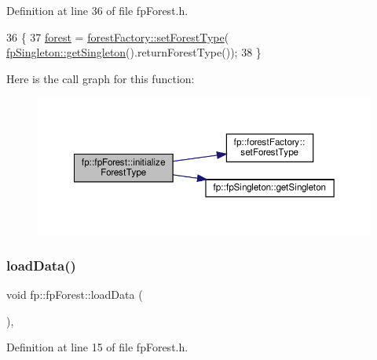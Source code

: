 Definition at line 36 of file fp\+Forest.\+h.


\begin{DoxyCode}
36                                               \{
37                 \hyperlink{classfp_1_1fpForest_a4ce6af867d36c8d62c860db8982235c4}{forest} = \hyperlink{classfp_1_1forestFactory_a856050d77f96dd155d41b95684552c20}{forestFactory::setForestType}(
      \hyperlink{classfp_1_1fpSingleton_a8bdae77b68521003e3fc630edec2e240}{fpSingleton::getSingleton}().returnForestType());
38             \}
\end{DoxyCode}
Here is the call graph for this function\+:
\nopagebreak
\begin{figure}[H]
\begin{center}
\leavevmode
\includegraphics[width=350pt]{classfp_1_1fpForest_a776ae408ea6c9af459e6ebba7e363d57_cgraph}
\end{center}
\end{figure}
\mbox{\label{classfp_1_1fpForest_a01631065f4909f10cea4b690084a345a}} 
\subsubsection{\texorpdfstring{load\+Data()}{loadData()}}
{\footnotesize\ttfamily void fp\+::fp\+Forest\+::load\+Data (\begin{DoxyParamCaption}{ }\end{DoxyParamCaption})\hspace{0.3cm}{\ttfamily [inline]}, {\ttfamily [protected]}}



Definition at line 15 of file fp\+Forest.\+h.


